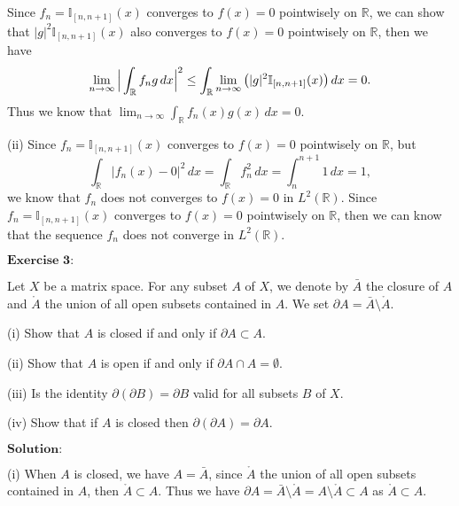 \documentclass[12pt,a4paper]{ctexart}
\begin{document}
Since $f_{n} = \mathbb{I}_{[n, n+1]} (x)$ converges to $f(x) = 0$ pointwisely on $\mathbb{R}$, we can show that $|g|^{2} \mathbb{I}_{[n, n+1]} (x)$ also converges to $f(x) = 0$ pointwisely on $\mathbb{R}$, then we have
\begin{equation*}
    \lim_{n \to \infty} \Big{|} \int_{\mathbb{R}}^{} f_{n} g \, d x \Big{|}^{2} \leq \int_{\mathbb{R}}^{} \lim_{n \to \infty} \big{(} |g|^{2} \mathbb{I}_{[n, n+1]} (x)  \big{)} \, d x = 0.
\end{equation*}
Thus we know that $\lim_{n \to \infty} \int_{\mathbb{R}}^{} f_{n}(x) g(x) \, d x = 0$.

(ii) Since $f_{n} = \mathbb{I}_{[n, n+1]} (x)$ converges to $f(x) = 0$ pointwisely on $\mathbb{R}$, but 
\begin{equation*}
    \int_{\mathbb{R}}^{} |f_{n}(x) - 0|^{2} \, d x = \int_{\mathbb{R}}^{} f_{n}^{2} \, d x = \int_{n}^{n + 1} 1 \, d x = 1,
\end{equation*}
we know that $f_{n}$ does not converges to $f(x) = 0$ in $L^{2}(\mathbb{R})$. Since $f_{n} = \mathbb{I}_{[n, n+1]} (x)$ converges to $f(x) = 0$ pointwisely on $\mathbb{R}$, then we can know that the sequence $f_{n}$ does not converge in $L^{2}(\mathbb{R})$.

\vspace{8pt}

$\textbf{Exercise 3:}$

Let $X$ be a matrix space. For any subset $A$ of $X$, we denote by $\bar{A}$ the closure of $A$ and $\mathring{A}$ the union of all open subsets contained in $A$. We set $\partial A = \bar{A} \setminus \mathring{A} $.

(i) Show that $A$ is closed if and only if $\partial A \subset A$.

(ii) Show that $A$ is open if and only if $\partial A \cap A = \emptyset$.

(iii) Is the identity $\partial (\partial B) = \partial B$ valid for all subsets $B$ of $X$.
  
(iv) Show that if $A$ is closed then $\partial(\partial A) = \partial A$.

\vspace{8pt}
$\textbf{Solution:}$

(i) When $A$ is closed, we have $A = \bar{A}$, since $\mathring{A}$ the union of all open subsets contained in $A$, then $\mathring{A} \subset A$. Thus we have $\partial A = \bar{A} \setminus \mathring{A} = A \setminus \mathring{A}  \subset A$ as $\mathring{A} \subset A$.
\end{document}
